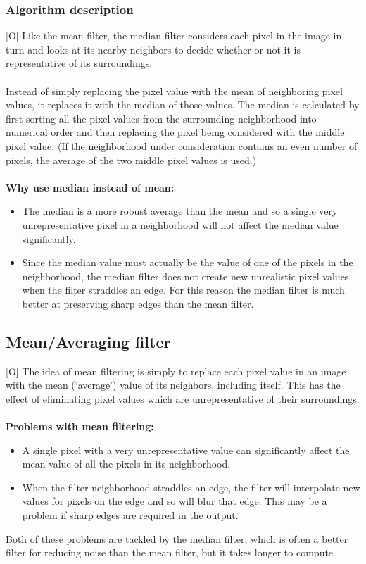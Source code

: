 \documentclass[12pt]{article}
\begin{document}
	\subsubsection{Algorithm description}
	[O] Like the mean filter, the median filter considers each pixel in the image in turn and 
	looks at its nearby neighbors to decide whether or not it is representative of its surroundings.\\
	\\
	Instead of simply replacing the pixel value with the mean of neighboring pixel values, it replaces 
	it with the median of those values. The median is calculated by first sorting all the pixel values 
	from the surrounding neighborhood into numerical order and then replacing the pixel being considered 
	with the middle pixel value. (If the neighborhood under consideration contains an even number of 
	pixels, the average of the two middle pixel values is used.)\\
	\\
	\textbf{Why use median instead of mean:}
	\begin{itemize}
	
	\item The median is a more robust average than the mean and so a single very unrepresentative pixel
	in a neighborhood will not affect the median value significantly.

    \item Since the median value must actually be the value of one of the pixels in the neighborhood, 
    the median filter does not create new unrealistic pixel values when the filter straddles an edge. 
    For this reason the median filter is much better at preserving sharp edges than the mean filter. 
	\end{itemize}

	\subsection{Mean/Averaging filter}
	[O] The idea of mean filtering is simply to replace each pixel value in an image with the 
	mean (`average') value of its neighbors, including itself. This has the effect of eliminating 
	pixel values which are unrepresentative of their surroundings.\\
	\\	
	\textbf{Problems with mean filtering:}
	\begin{itemize}
		\item A single pixel with a very unrepresentative value can significantly affect 
		the mean value of all the pixels in its neighborhood. 
		\item When the filter neighborhood straddles an edge, the filter will interpolate 
		new values for pixels on the edge and so will blur that edge. This may be a problem
		if sharp edges are required in the output. 
	\end{itemize}
	Both of these problems are tackled by the median filter, which is often a better filter 
	for reducing noise than the mean filter, but it takes longer to compute. 
%	
%	
\end{document}
